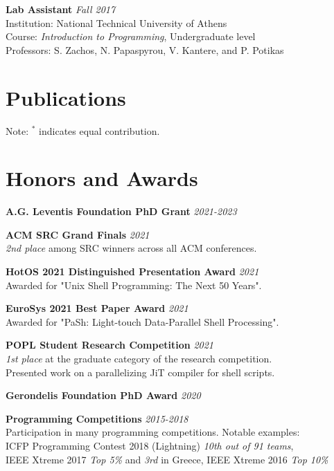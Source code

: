 \documentclass[margin]{res}
\begin{document}
\begin{resume}
\textbf{Lab Assistant}  \hfill {\em Fall 2017} \\
Institution: National Technical University of Athens \\
Course: \textit{Introduction to Programming}, Undergraduate level \\
Professors: S. Zachos, N. Papaspyrou, V. Kantere, and P. Potikas

\section{Publications}



Note: $^*$ indicates equal contribution.

\section{Honors and Awards}

\textbf{A.G. Leventis Foundation PhD Grant} \hfill {\em 2021-2023}

\textbf{ACM SRC Grand Finals} \hfill {\em 2021} \\
\textit{2nd place} among SRC winners across all ACM conferences.

\textbf{HotOS 2021 Distinguished Presentation Award} \hfill {\em 2021} \\
Awarded for "Unix Shell Programming: The Next 50 Years".

\textbf{EuroSys 2021 Best Paper Award} \hfill {\em 2021} \\
Awarded for "PaSh: Light-touch Data-Parallel Shell Processing".

\textbf{POPL Student Research Competition} \hfill {\em 2021} \\
\textit{1st place} at the graduate category of the research competition. \\
Presented work on a parallelizing JiT compiler for shell scripts. 

\textbf{Gerondelis Foundation PhD Award} \hfill {\em 2020}

\textbf{Programming Competitions}  \hfill {\em 2015-2018} \\
Participation in many programming competitions. Notable examples: \\
ICFP Programming Contest 2018 (Lightning) \textit{10th out of 91 teams}, \\
IEEE Xtreme 2017 \textit{Top 5\%} and \textit{3rd} in Greece, IEEE Xtreme 2016 \textit{Top 10\%}


\end{resume}
\end{document}
